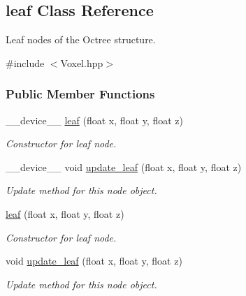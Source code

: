\hypertarget{classleaf}{}\subsection{leaf Class Reference}
\label{classleaf}


Leaf nodes of the Octree structure.  




{\ttfamily \#include $<$Voxel.\+hpp$>$}

\subsubsection*{Public Member Functions}
\begin{DoxyCompactItemize}
\item 
\+\_\+\+\_\+device\+\_\+\+\_\+ \hyperlink{classleaf_adfaf04cd4b50545cbc902d1aa36bc609}{leaf} (float x, float y, float z)
\begin{DoxyCompactList}\small\item\em Constructor for leaf node. \end{DoxyCompactList}\item 
\+\_\+\+\_\+device\+\_\+\+\_\+ void \hyperlink{classleaf_a3c205ce57e242832977bde6e1a04d7da}{update\+\_\+leaf} (float x, float y, float z)
\begin{DoxyCompactList}\small\item\em Update method for this node object. \end{DoxyCompactList}\item 
\hyperlink{classleaf_aafe906fcbc78cef65683b3015de636bd}{leaf} (float x, float y, float z)
\begin{DoxyCompactList}\small\item\em Constructor for leaf node. \end{DoxyCompactList}\item 
void \hyperlink{classleaf_adacc1e0d36163c7fd0a7c31576ecf4e8}{update\+\_\+leaf} (float x, float y, float z)
\begin{DoxyCompactList}\small\item\em Update method for this node object. \end{DoxyCompactList}\end{DoxyCompactItemize}
